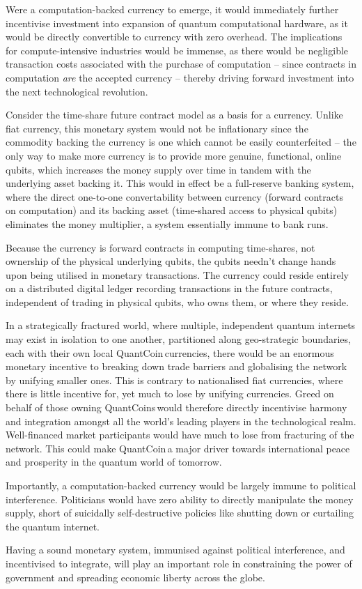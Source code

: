 Were a computation-backed currency to emerge, it would immediately further incentivise investment into expansion of quantum computational hardware, as it would be directly convertible to currency with zero overhead. The implications for compute-intensive industries would be immense, as there would be negligible transaction costs associated with the purchase of computation -- since contracts in computation \textit{are} the accepted currency -- thereby driving forward investment into the next technological revolution.

Consider the time-share future contract model as a basis for a currency. Unlike fiat currency, this monetary system would not be inflationary since the commodity backing the currency is one which cannot be easily counterfeited -- the only way to make more currency is to provide more genuine, functional, online qubits, which increases the money supply over time in tandem with the underlying asset backing it. This would in effect be a full-reserve banking system, where the direct one-to-one convertability between currency (forward contracts on computation) and its backing asset (time-shared access to physical qubits) eliminates the money multiplier, a system essentially immune to bank runs.

Because the currency is forward contracts in computing time-shares, not ownership of the physical underlying qubits, the qubits needn't change hands upon being utilised in monetary transactions. The currency could reside entirely on a distributed digital ledger recording transactions in the future contracts, independent of trading in physical qubits, who owns them, or where they reside.

In a strategically fractured world, where multiple, independent quantum internets may exist in isolation to one another, partitioned along geo-strategic boundaries, each with their own local QuantCoin\texttrademark\,currencies, there would be an enormous monetary incentive to breaking down trade barriers and globalising the network by unifying smaller ones. This is contrary to nationalised fiat currencies, where there is little incentive for, yet much to lose by unifying currencies. Greed on behalf of those owning QuantCoins\texttrademark\,would therefore directly incentivise harmony and integration amongst all the world's leading players in the technological realm. Well-financed market participants would have much to lose from fracturing of the network. This could make QuantCoin\texttrademark\,a major driver towards international peace and prosperity in the quantum world of tomorrow.

Importantly, a computation-backed currency would be largely immune to political interference. Politicians would have zero ability to directly manipulate the money supply, short of suicidally self-destructive policies like shutting down or curtailing the quantum internet.

Having a sound monetary system, immunised against political interference, and incentivised to integrate, will play an important role in constraining the power of government and spreading economic liberty across the globe.